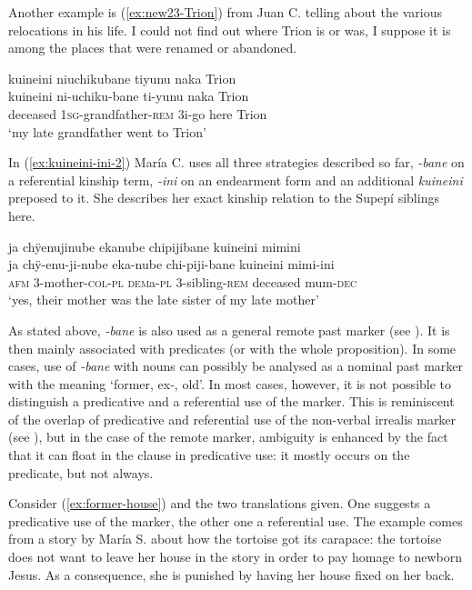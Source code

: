 Another example is (\ref{ex:new23-Trion}) from Juan C. telling about the various relocations in his life. I could not find out where Trion is or was, I suppose it is among the places that were renamed or abandoned.

\ea\label{ex:new23-Trion}
\begingl
\glpreamble kuineini niuchikubane tiyunu naka Trion\\
\gla kuineini ni-uchiku-bane ti-yunu naka Trion\\
\glb deceased 1\textsc{sg}-grandfather-\textsc{rem} 3i-go here Trion\\
\glft ‘my late grandfather went to Trion’
\endgl
\trailingcitation{[mqx-p110826l.440-442]}
\xe

In (\ref{ex:kuineini-ini-2}) María C. uses all three strategies described so far, \textit{-bane} on a referential kinship term, \textit{-ini} on an endearment form and an additional \textit{kuineini} preposed to it. She describes her exact kinship relation to the Supepí siblings here. 

\ea\label{ex:kuineini-ini-2}
\begingl 
\glpreamble ja chÿenujinube ekanube chipijibane kuineini mimini\\
\gla ja chÿ-enu-ji-nube eka-nube chi-piji-bane kuineini mimi-ini\\ 
\glb \textsc{afm} 3-mother-\textsc{col}-\textsc{pl} \textsc{dem}a-\textsc{pl} 3-sibling-\textsc{rem} deceased mum-\textsc{dec}\\ 
\glft ‘yes, their mother was the late sister of my late mother’
\trailingcitation{[cux-c120410ls.124-125]}
\xe

As stated above, \textit{-bane} is also used as a general remote past marker (see ). It is then mainly associated with predicates (or with the whole proposition). In some cases, use of \textit{-bane} with nouns can possibly be analysed as a nominal past marker with the meaning ‘former, ex-, old’. In most cases, however, it is not possible to distinguish a predicative and a referential use of the marker. This is reminiscent of the overlap of predicative and referential use of the non-verbal irrealis marker (see ), but in the case of the remote marker, ambiguity is enhanced by the fact that it can float in the clause in predicative use: it mostly occurs on the predicate, but not always. 

Consider (\ref{ex:former-house}) and the two translations given. One suggests a predicative use of the marker, the other one a referential use. The example comes from a story by María S. about how the tortoise got its carapace: the tortoise does not want to leave her house in the story in order to pay homage to newborn Jesus. As a consequence, she is punished by having her house fixed on her back.

